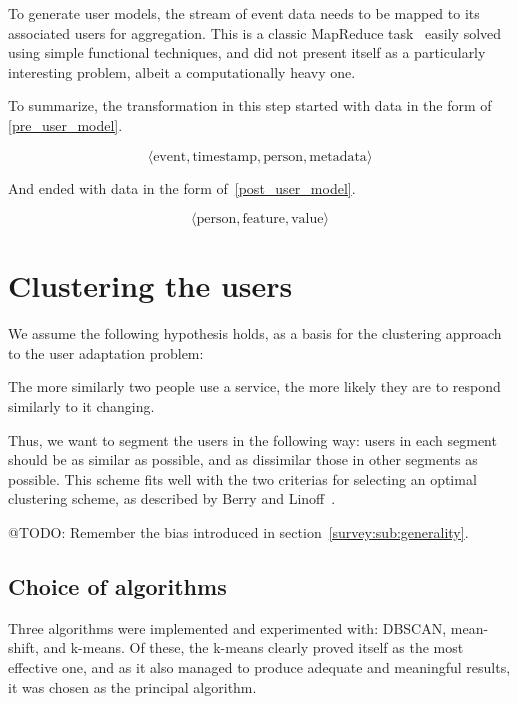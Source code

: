 To generate user models, the stream of event data needs to be mapped to its associated users for aggregation. This is a classic MapReduce task~\cite{Dean2008} easily solved using simple functional techniques, and did not present itself as a particularly interesting problem, albeit a computationally heavy one.

To summarize, the transformation in this step started with data in the form of \eqref{pre_user_model}.

\begin{equation}
  \langle \text{event}, \text{timestamp}, \text{person}, \text{metadata} \rangle
  \label{pre_user_model}
\end{equation}

And ended with data in the form of~\eqref{post_user_model}.

\begin{equation}
  \langle \text{person}, \text{feature}, \text{value} \rangle
  \label{post_user_model}
\end{equation}

\section{Clustering the users}
\label{approach:sec:clustering}

We assume the following hypothesis holds, as a basis for the clustering approach to the user adaptation problem:

\begin{hypothesis}
The more similarly two people use a service, the more likely they are to respond similarly to it changing.
\end{hypothesis}

Thus, we want to segment the users in the following way: users in each segment should be as similar as possible, and as dissimilar those in other segments as possible. This scheme fits well with the two criterias for selecting an optimal clustering scheme, as described by Berry and Linoff~\cite{Berry1997}.

@TODO: Remember the bias introduced in section~\ref{survey:sub:generality}.

\subsection{Choice of algorithms}
\label{approach:sec:clustering_algorithms}

Three algorithms were implemented and experimented with: DBSCAN, mean-shift, and k-means. Of these, the k-means clearly proved itself as the most effective one, and as it also managed to produce adequate and meaningful results, it was chosen as the principal algorithm.

